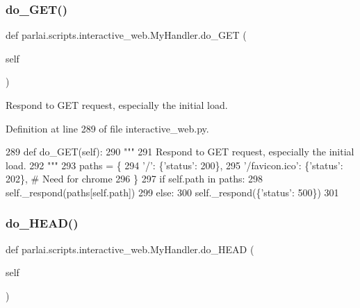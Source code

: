 \subsubsection{\texorpdfstring{do\+\_\+\+G\+E\+T()}{do\_GET()}}
{\footnotesize\ttfamily def parlai.\+scripts.\+interactive\+\_\+web.\+My\+Handler.\+do\+\_\+\+G\+ET (\begin{DoxyParamCaption}\item[{}]{self }\end{DoxyParamCaption})}

\begin{DoxyVerb}Respond to GET request, especially the initial load.
\end{DoxyVerb}
 

Definition at line 289 of file interactive\+\_\+web.\+py.


\begin{DoxyCode}
289     \textcolor{keyword}{def }do\_GET(self):
290         \textcolor{stringliteral}{"""}
291 \textcolor{stringliteral}{        Respond to GET request, especially the initial load.}
292 \textcolor{stringliteral}{        """}
293         paths = \{
294             \textcolor{stringliteral}{'/'}: \{\textcolor{stringliteral}{'status'}: 200\},
295             \textcolor{stringliteral}{'/favicon.ico'}: \{\textcolor{stringliteral}{'status'}: 202\},  \textcolor{comment}{# Need for chrome}
296         \}
297         \textcolor{keywordflow}{if} self.path \textcolor{keywordflow}{in} paths:
298             self.\_respond(paths[self.path])
299         \textcolor{keywordflow}{else}:
300             self.\_respond(\{\textcolor{stringliteral}{'status'}: 500\})
301 
\end{DoxyCode}
\mbox{\label{classparlai_1_1scripts_1_1interactive__web_1_1MyHandler_a2231328696ebba922f2e5e1d9b8ebb56}} 
\subsubsection{\texorpdfstring{do\+\_\+\+H\+E\+A\+D()}{do\_HEAD()}}
{\footnotesize\ttfamily def parlai.\+scripts.\+interactive\+\_\+web.\+My\+Handler.\+do\+\_\+\+H\+E\+AD (\begin{DoxyParamCaption}\item[{}]{self }\end{DoxyParamCaption})}

